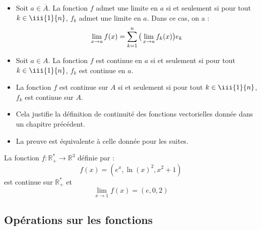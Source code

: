 \documentclass[french,11pt,twoside]{VcCours}
\begin{document}
\begin{Proposition}{} 

\begin{itemize}
\item Soit $a \in \overline{A}$. La fonction $f$ admet une limite en $a$ si et seulement si pour tout $k \in\iii{1}{n}$, $f_k$ admet une limite en $a$. Dans ce cas, on a :
$$ \lim_{x \rightarrow a} f(x) =  \sum_{k=1}^n \big{(} \lim_{x \rightarrow a} f_k(x) \big{)} e_k$$
\item Soit $a \in A$. La fonction $f$ est continue en $a$ si et seulement si pour tout $k \in\iii{1}{n}$, $f_k$ est continue en $a$.
\item La fonction $f$ est continue sur $A$ si et seulement si pour tout $k \in\iii{1}{n}$, $f_k$ est continue sur $A$.
\end{itemize}
\end{Proposition}

\begin{Remarques}{}
\begin{itemize}
\item Cela justifie la définition de continuité des fonctions vectorielles donnée dans un chapitre précédent.
\item La preuve est équivalente à celle donnée pour les suites.
\end{itemize}
\end{Remarques}{}

\medskip

\begin{Exemple} La fonction $f : \mathbb{R}_+^* \rightarrow \mathbb{R}^3$ définie par :
$$ f(x) = (e^x, \ln(x)^2, x^2+1)$$
est continue sur $\mathbb{R}_+^*$ et 
$$ \lim_{x \rightarrow 1} f(x) = (e,0,2)$$
\end{Exemple}
%
%

\subsection{Opérations sur les fonctions}
\end{document}
